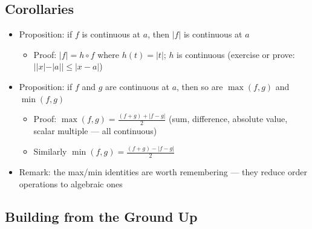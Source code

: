\documentclass[
  10pt,
  letterpaper,
]{scrbook}
\providecommand{\tightlist}{%
  \setlength{\itemsep}{0pt}\setlength{\parskip}{0pt}}
\begin{document}
\subsection{Corollaries}\label{corollaries}

\begin{itemize}
\tightlist
\item
  Proposition: if \(f\) is continuous at \(a\), then \(|f|\) is
  continuous at \(a\)

  \begin{itemize}
  \tightlist
  \item
    Proof: \(|f| = h \circ f\) where \(h(t) = |t|\); \(h\) is continuous
    (exercise or prove: \(||x| - |a|| \leq |x - a|\))
  \end{itemize}
\item
  Proposition: if \(f\) and \(g\) are continuous at \(a\), then so are
  \(\max(f, g)\) and \(\min(f, g)\)

  \begin{itemize}
  \tightlist
  \item
    Proof: \(\max(f, g) = \frac{(f + g) + |f - g|}{2}\) (sum,
    difference, absolute value, scalar multiple --- all continuous)
  \item
    Similarly \(\min(f, g) = \frac{(f + g) - |f - g|}{2}\)
  \end{itemize}
\item
  Remark: the max/min identities are worth remembering --- they reduce
  order operations to algebraic ones
\end{itemize}

\subsection{Building from the Ground
Up}\label{building-from-the-ground-up}
\end{document}
